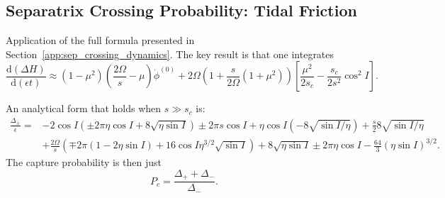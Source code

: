 \documentclass[twocolumn]{aastex63}
\newcommand*{\rd}[2]{\frac{\mathrm{d}#1}{\mathrm{d}#2}}
\newcommand*{\p}[1]{\left(#1\right)}
\newcommand*{\s}[1]{\left[#1\right]}
\begin{document}
\subsection{Separatrix Crossing Probability: Tidal Friction}\label{app:probs}

Application of the full formula presented in
Section~\ref{app:sep_crossing_dynamics}. The key result is that one integrates
\begin{equation}
    \rd{(\Delta H)}{(\epsilon t)} \approx
            (1 - \mu^2)\p{\frac{2\Omega}{s} - \mu}
                \dot{\phi}^{(0)} + 2\Omega\p{1 + \frac{s}{2\Omega}(1 + \mu^2)}
                \s{\frac{\mu^2}{2s_c} - \frac{s_c}{2s^2}\cos^2 I}.
\end{equation}

An analytical form that holds when $s \gg s_c$ is:
\begin{align}
    \frac{\Delta_{\pm}}{\epsilon} ={}&
        -2\cos I\p{\pm 2\pi \eta \cos I + 8\sqrt{\eta \sin I}}
        \pm 2\pi s\cos I
        + \eta \cos I \p{-8\sqrt{\sin I / \eta}}
            + \frac{s}{2}8\sqrt{\sin I/\eta}\nonumber\\
        &+ \frac{2\Omega}{s}\p{\mp 2\pi\p{1 - 2\eta \sin I}
            + 16\cos I \eta^{3/2}\sqrt{\sin I}}
            + 8\sqrt{\eta \sin I}
            \pm 2 \pi \eta \cos I
            - \frac{64}{3} \p{\eta \sin I}^{3/2}.
\end{align}
The capture probability is then just
\begin{equation}
    P_c = \frac{\Delta_+ + \Delta_-}{\Delta_-}.
\end{equation}
\end{document}
